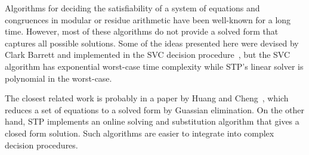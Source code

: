 Algorithms for deciding the satisfiability of a system of equations
and congruences in modular or residue arithmetic have been well-known
for a long time. However, most of these algorithms do not provide a
solved form that captures all possible solutions.  Some of the ideas
presented here were devised by Clark Barrett and implemented in the
SVC decision procedure~\cite{cheng01,BDL98}, but the SVC algorithm has
exponential worst-case time complexity while STP's linear solver is
polynomial in the worst-case.

The closest related work is probably in a paper by Huang and
Cheng~\cite{cheng01}, which reduces a set of equations to a solved
form by Guassian elimination. On the other hand, STP implements an
online solving and substitution algorithm that gives a closed form
solution. Such algorithms are easier to integrate into complex
decision procedures.








